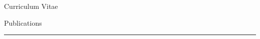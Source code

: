\begin{cv}{\centerline{\LARGE Curriculum Vitae}}
\begin{cvlist}{Publications}
\begin{list}{}{\leftmargin=-1em}
%    
%    
%    
%    
%    
    
    \end{list}
  \end{cvlist}

  \hrule
  


\end{cv}
